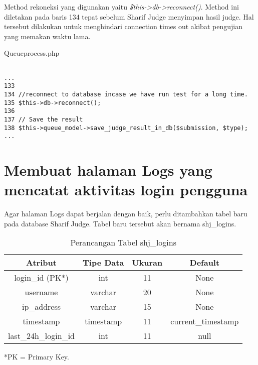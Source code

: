 Method rekoneksi yang digunakan yaitu \textit{\$this->db->reconnect()}. Method ini diletakan pada baris 134 tepat sebelum Sharif Judge menyimpan hasil judge. Hal tersebut dilakukan untuk menghindari connection times out akibat pengujian yang memakan waktu lama.

Queueprocess.php
\begin{lstlisting}[basicstyle=\ttfamily, frame=single,
columns=fullflexible, keepspaces=true]

...
133
134	//reconnect to database incase we have run test for a long time.
135	$this->db->reconnect();
136
137	// Save the result
138	$this->queue_model->save_judge_result_in_db($submission, $type);
...

\end{lstlisting}

\section{Membuat halaman Logs yang mencatat aktivitas login pengguna}
Agar halaman Logs dapat berjalan dengan baik, perlu ditambahkan tabel baru pada database Sharif Judge.  Tabel baru tersebut akan bernama shj\_logins. 
\begin{table}[H] %
	\centering 
	\caption{Perancangan Tabel shj\_logins}
	\label{tab:tabellogs}
		\begin{tabular}{|c|c|c|c|}
			\hline
			\textbf{Atribut} & \textbf{Tipe Data} & \textbf{Ukuran}  & \textbf{Default} \\
			\hline
			login\_id (PK*) & int & 11  & None \\
			\hline
			username & varchar & 20  & None \\
			\hline
			ip\_address & varchar & 15  & None \\
			\hline
			timestamp & timestamp & 11  & current\_timestamp \\
			\hline
			last\_24h\_login\_id	 & int & 11  & null \\
			\hline
		\end{tabular}
\end{table}
*PK = Primary Key.

